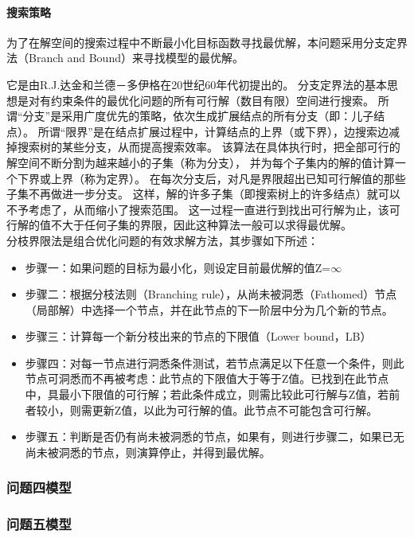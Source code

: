\documentclass[UTF8]{ctexart}
\begin{document}
\paragraph{搜索策略}
为了在解空间的搜索过程中不断最小化目标函数寻找最优解，本问题采用分支定界法（Branch and Bound）\cite{bbalgorithm}来寻找模型的最优解。

它是由R.J.达金和兰德－多伊格在20世纪60年代初提出的。
分支定界法的基本思想是对有约束条件的最优化问题的所有可行解（数目有限）空间进行搜索。
所谓“分支”是采用广度优先的策略，依次生成扩展结点的所有分支（即：儿子结点）。
所谓“限界”是在结点扩展过程中，计算结点的上界（或下界），边搜索边减掉搜索树的某些分支，从而提高搜索效率。
该算法在具体执行时，把全部可行的解空间不断分割为越来越小的子集（称为分支），
并为每个子集内的解的值计算一个下界或上界（称为定界）。
在每次分支后，对凡是界限超出已知可行解值的那些子集不再做进一步分支。
这样，解的许多子集（即搜索树上的许多结点）就可以不予考虑了，从而缩小了搜索范围。
这一过程一直进行到找出可行解为止，该可行解的值不大于任何子集的界限，因此这种算法一般可以求得最优解。\\

分枝界限法是组合优化问题的有效求解方法，其步骤如下所述：
\begin{itemize}
		\item 步骤一：如果问题的目标为最小化，则设定目前最优解的值Z=$\infty$
		\item 步骤二：根据分枝法则（Branching rule），从尚未被洞悉（Fathomed）节点（局部解）中选择一个节点，并在此节点的下一阶层中分为几个新的节点。
		\item 步骤三：计算每一个新分枝出来的节点的下限值（Lower bound，LB）
		\item  步骤四：对每一节点进行洞悉条件测试，若节点满足以下任意一个条件，则此节点可洞悉而不再被考虑：此节点的下限值大于等于Z值。已找到在此节点中，具最小下限值的可行解；若此条件成立，则需比较此可行解与Z值，若前者较小，则需更新Z值，以此为可行解的值。此节点不可能包含可行解。
		\item 步骤五：判断是否仍有尚未被洞悉的节点，如果有，则进行步骤二，如果已无尚未被洞悉的节点，则演算停止，并得到最优解。
\end{itemize}


\subsubsection{问题四模型}

\subsubsection{问题五模型}
\end{document}
